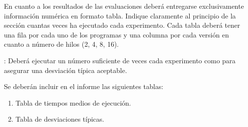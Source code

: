 En cuanto a los resultados de las evaluaciones deberá entregarse exclusivamente
información numérica en formato tabla. Indique claramente al principio de la
sección cuantas veces ha ejecutado cada experimento.  Cada tabla deberá tener
una fila por cada uno de los programas y una columna por cada versión en cuanto
a número de hilos (2, 4, 8, 16).

: Deberá ejecutar un número suficiente de veces cada
experimento como para asegurar una desviación típica aceptable.

Se deberán incluir en el informe las siguientes tablas:

\begin{enumerate}
  \item Tabla de tiempos medios de ejecución.
  \item Tabla de desviaciones típicas.
\end{enumerate}
